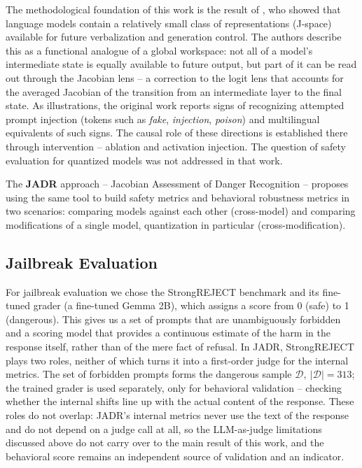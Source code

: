\documentclass[10pt,twocolumn]{article}
\newcommand{\Dset}{\mathcal{D}}
\begin{document}
The methodological foundation of this work is the result of \citet{gurnee2026workspace}, who showed that language models contain a relatively small class of representations (J-space) available for future verbalization and generation control. The authors describe this as a functional analogue of a global workspace: not all of a model's intermediate state is equally available to future output, but part of it can be read out through the Jacobian lens -- a correction to the logit lens that accounts for the averaged Jacobian of the transition from an intermediate layer to the final state. As illustrations, the original work reports signs of recognizing attempted prompt injection (tokens such as \textit{fake}, \textit{injection}, \textit{poison}) and multilingual equivalents of such signs. The causal role of these directions is established there through intervention -- ablation and activation injection. The question of safety evaluation for quantized models was not addressed in that work.

The \textbf{\textsc{JADR}} approach -- Jacobian Assessment of Danger Recognition -- proposes using the same tool to build safety metrics and behavioral robustness metrics in two scenarios: comparing models against each other (cross-model) and comparing modifications of a single model, quantization in particular (cross-modification).

\subsection{Jailbreak Evaluation}

For jailbreak evaluation we chose the StrongREJECT benchmark \citep{souly2024strongreject} and its fine-tuned grader (a fine-tuned Gemma 2B), which assigns a score from 0 (safe) to 1 (dangerous). This gives us a set of prompts that are unambiguously forbidden and a scoring model that provides a continuous estimate of the harm in the response itself, rather than of the mere fact of refusal. In JADR, StrongREJECT plays two roles, neither of which turns it into a first-order judge for the internal metrics. The set of forbidden prompts forms the dangerous sample $\Dset, \ |\Dset| = 313$; the trained grader is used separately, only for behavioral validation -- checking whether the internal shifts line up with the actual content of the response. These roles do not overlap: JADR's internal metrics never use the text of the response and do not depend on a judge call at all, so the LLM-as-judge limitations discussed above do not carry over to the main result of this work, and the behavioral score remains an independent source of validation and an indicator.
\end{document}
